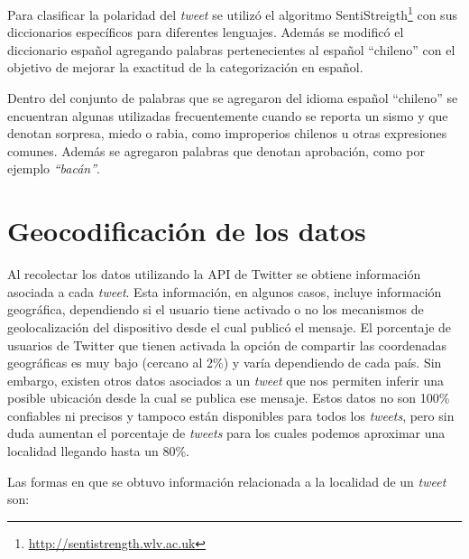 Para clasificar la polaridad del \textit{tweet} se utilizó el algoritmo SentiStreigth\footnote{\url{http://sentistrength.wlv.ac.uk}} con sus diccionarios específicos para diferentes lenguajes. 
%
Además se modificó el diccionario español agregando palabras pertenecientes al español ``chileno'' con el objetivo de mejorar la exactitud de la categorización en español.  


Dentro del conjunto de palabras que se agregaron del idioma español ``chileno'' se encuentran algunas utilizadas frecuentemente cuando se reporta un sismo y que denotan sorpresa, miedo o rabia, como improperios chilenos u otras expresiones comunes.
%
Además se agregaron palabras que denotan aprobación, como por ejemplo \textit{``bacán''}.


\section{Geocodificación de los datos}
\label{sec:geocodificacion}

Al recolectar los datos utilizando la API de Twitter se obtiene información asociada a cada \textit{tweet}. 
%
Esta información, en algunos casos, incluye información geográfica, dependiendo si el usuario tiene activado o no los mecanismos de geolocalización del dispositivo desde el cual publicó el mensaje.
%
El porcentaje de usuarios de Twitter que tienen activada la opción de compartir las coordenadas geográficas es muy bajo (cercano al 2\%) y varía dependiendo de cada país. 
%
Sin embargo, existen otros datos asociados a un \textit{tweet} que nos permiten inferir una posible ubicación desde la cual se publica ese mensaje. 
%
Estos datos no son 100\% confiables ni precisos y tampoco están disponibles para todos los \textit{tweets}, pero sin duda aumentan el porcentaje de \textit{tweets} para los cuales podemos aproximar una localidad llegando hasta un 80\%.


Las formas en que se obtuvo información relacionada a la localidad de un \textit{tweet} son:

